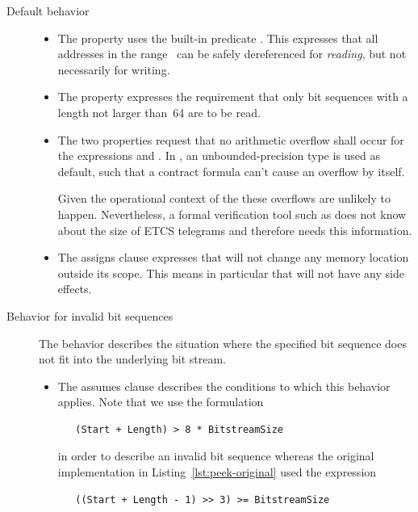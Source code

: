 \begin{description}
\item[Default behavior]

\begin{itemize}
\item
The property  uses the built-in \acsl predicate .
This expresses that all addresses in the range~
can be safely dereferenced for \emph{reading}, but not necessarily for writing.

\item
The property  expresses the requirement that only
bit sequences with a length not larger than~64 are to be read.
\item
The two  properties request that no arithmetic overflow
shall occur for the expressions  and
.
In \acsl, an unbounded-precision type  is used
as default, such that a contract formula can't cause an overflow by
itself.

Given the operational context of the \bitwalker these overflows are unlikely
to happen. 
Nevertheless, a formal verification tool such as \framacwp does not
know about the size of ETCS telegrams and therefore needs this information.

\item
The assigns clause expresses that \peek will not change any memory location
outside its scope.
This means in particular that \peek will not have any side effects.
      
\end{itemize}

\item[Behavior for invalid bit sequences]

The behavior  describes the situation where
the specified bit sequence does not fit into the underlying bit stream.

\begin{itemize}
\item
The assumes clause describes the conditions to which this behavior applies.
Note that we use the formulation 
\begin{verbatim}
   (Start + Length) > 8 * BitstreamSize
\end{verbatim}
in order to describe an invalid bit sequence whereas the original implementation
in Listing~\ref{lst:peek-original} used the expression
\begin{verbatim}
   ((Start + Length - 1) >> 3) >= BitstreamSize
\end{verbatim}


\end{itemize}
\end{description}
